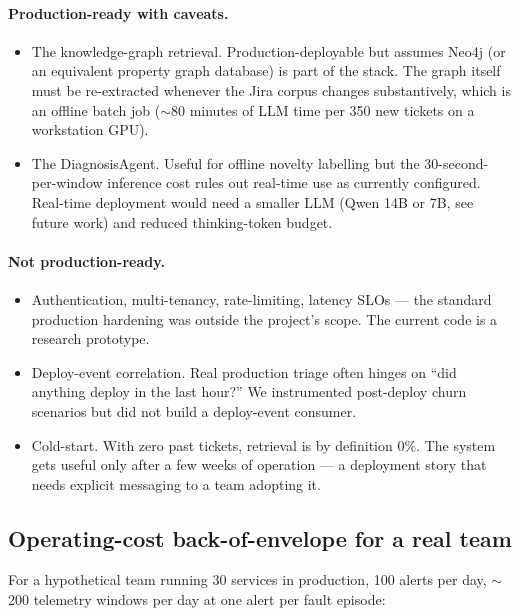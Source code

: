 \paragraph{Production-ready with caveats.}
\begin{itemize}
\item The knowledge-graph retrieval. Production-deployable but assumes Neo4j (or an equivalent property graph database) is part of the stack. The graph itself must be re-extracted whenever the Jira corpus changes substantively, which is an offline batch job ($\sim$80 minutes of LLM time per 350 new tickets on a workstation GPU).
\item The DiagnosisAgent. Useful for offline novelty labelling but the 30-second-per-window inference cost rules out real-time use as currently configured. Real-time deployment would need a smaller LLM (Qwen 14B or 7B, see future work) and reduced thinking-token budget.
\end{itemize}

\paragraph{Not production-ready.}
\begin{itemize}
\item Authentication, multi-tenancy, rate-limiting, latency SLOs --- the standard production hardening was outside the project's scope. The current code is a research prototype.
\item Deploy-event correlation. Real production triage often hinges on ``did anything deploy in the last hour?'' We instrumented post-deploy churn scenarios but did not build a deploy-event consumer.
\item Cold-start. With zero past tickets, retrieval is by definition 0\%. The system gets useful only after a few weeks of operation --- a deployment story that needs explicit messaging to a team adopting it.
\end{itemize}

\subsection{Operating-cost back-of-envelope for a real team}

For a hypothetical team running 30 services in production, 100 alerts per day, $\sim$200 telemetry windows per day at one alert per fault episode:

